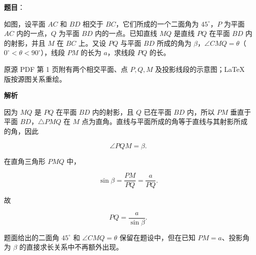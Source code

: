 \begin{answer}

\textbf{题目}：

如图，设平面 $AC$ 和 $BD$ 相交于 $BC$，它们所成的一个二面角为 $45^\circ$，$P$ 为平面 $AC$ 内的一点，$Q$ 为平面 $BD$ 内的一点。已知直线 $MQ$ 是直线 $PQ$ 在平面 $BD$ 内的射影，并且 $M$ 在 $BC$ 上。又设 $PQ$ 与平面 $BD$ 所成的角为 $\beta$，$\angle CMQ=\theta$（$0^\circ<\theta<90^\circ$），线段 $PM$ 的长为 $a$，求线段 $PQ$ 的长。

\begin{gktip}
原源 PDF 第 1 页附有两个相交平面、点 $P,Q,M$ 及投影线段的示意图；LaTeX 版按源图关系重绘。
\end{gktip}
\nopagebreak[4]
\begin{center}\end{center}
\nopagebreak[4]
\textbf{解析}

因为 $MQ$ 是 $PQ$ 在平面 $BD$ 内的射影，且 $Q$ 已在平面 $BD$ 内，所以 $PM$ 垂直于平面 $BD$，$\triangle PMQ$ 在 $M$ 点为直角。直线与平面所成的角等于直线与其射影所成的角，因此

\nopagebreak[4]
\[
\angle PQM=\beta.
\]

在直角三角形 $PMQ$ 中，

\nopagebreak[4]
\[
\sin\beta=\frac{PM}{PQ}=\frac a{PQ}.
\]

故

\nopagebreak[4]
\[
PQ=\frac a{\sin\beta}.
\]

题面给出的二面角 $45^\circ$ 和 $\angle CMQ=\theta$ 保留在题设中，但在已知 $PM=a$、投影角为 $\beta$ 的直接求长关系中不再额外出现。


\end{answer}

